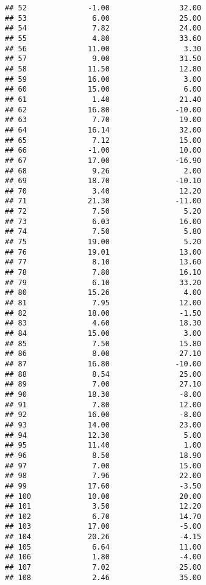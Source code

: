 \documentclass[
]{book}
\begin{document}
\begin{verbatim}
## 52              -1.00                32.00
## 53               6.00                25.00
## 54               7.82                24.00
## 55               4.80                33.60
## 56              11.00                 3.30
## 57               9.00                31.50
## 58              11.50                12.80
## 59              16.00                 3.00
## 60              15.00                 6.00
## 61               1.40                21.40
## 62              16.80               -10.00
## 63               7.70                19.00
## 64              16.14                32.00
## 65               7.12                15.00
## 66              -1.00                10.00
## 67              17.00               -16.90
## 68               9.26                 2.00
## 69              18.70               -10.10
## 70               3.40                12.20
## 71              21.30               -11.00
## 72               7.50                 5.20
## 73               6.03                16.00
## 74               7.50                 5.80
## 75              19.00                 5.20
## 76              19.01                13.00
## 77               8.10                13.60
## 78               7.80                16.10
## 79               6.10                33.20
## 80              15.26                 4.00
## 81               7.95                12.00
## 82              18.00                -1.50
## 83               4.60                18.30
## 84              15.00                 3.00
## 85               7.50                15.80
## 86               8.00                27.10
## 87              16.80               -10.00
## 88               8.54                25.00
## 89               7.00                27.10
## 90              18.30                -8.00
## 91               7.80                12.00
## 92              16.00                -8.00
## 93              14.00                23.00
## 94              12.30                 5.00
## 95              11.40                 1.00
## 96               8.50                18.90
## 97               7.00                15.00
## 98               7.96                22.00
## 99              17.60                -3.50
## 100             10.00                20.00
## 101              3.50                12.20
## 102              6.70                14.70
## 103             17.00                -5.00
## 104             20.26                -4.15
## 105              6.64                11.00
## 106              1.80                -4.00
## 107              7.02                25.00
## 108              2.46                35.00

\end{verbatim}
\end{document}
